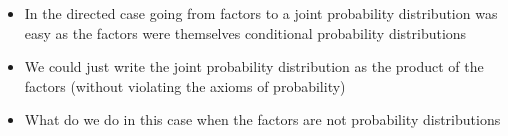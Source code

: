 \begin{frame}
\begin{columns}
\begin{overlayarea}{\textwidth}{\textheight}
\begin{itemize}
			\item<2-> In the directed case going from factors to a joint probability distribution was easy as the factors were themselves conditional probability distributions
			\item <3->We could just write the joint probability distribution as the product of the factors (without violating the axioms of probability)
			\item<4-> What do we do in this case when the factors are not probability distributions
		\end{itemize}
		\end{overlayarea}
	\end{columns}
	\end{frame}


\begin{frame}
	\begin{columns}
		\begin{overlayarea}{\textwidth}{\textheight}
		\begin{center}
		\begin{table}
\end{table}
\end{center}
\end{overlayarea}
\end{columns}
\end{frame}
